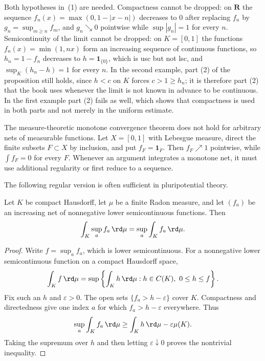 \begin{remark}
\label{rem:dini-hypotheses-sharp}
Both hypotheses in \,(1) are needed.  Compactness cannot
be dropped: on $\mathbf R$ the sequence $f_n(x)=\max(0,1-|x-n|)$ decreases to
$0$ after replacing $f_n$ by $g_n=\sup_{m\geq n}f_m$, and $g_n\searrow0$
pointwise while $\sup|g_n|=1$ for every $n$.  Semicontinuity of the limit
cannot be dropped: on $K=[0,1]$ the functions
$f_n(x)=\min(1,nx)$ form an increasing sequence of continuous functions, so
$h_n=1-f_n$ decreases to $h=\mathbf 1_{\{0\}}$, which is usc but not lsc, and
$\sup_K(h_n-h)=1$ for every $n$.  In the second example, part (2) of the
proposition still holds, since $h<c$ on $K$ forces $c>1\geq h_n$; it is
therefore part (2) that the book uses whenever the limit is not known in
advance to be continuous.  In the first example part (2) fails as well, which
shows that compactness is used in both parts and not merely in the uniform
estimate.
\end{remark}

\begin{remark}[Warning]
\label{rem:monotone-net-integration-warning}
The measure-theoretic monotone convergence theorem does not hold for
arbitrary nets of measurable functions.  Let $X=[0,1]$ with Lebesgue measure,
direct the finite subsets $F\subset X$ by inclusion, and put
$f_F=\mathbf 1_F$.  Then $f_F\nearrow1$ pointwise, while
$\int f_F=0$ for every $F$.  Whenever an argument integrates a monotone net,
it must use additional regularity or first reduce to a sequence.
\end{remark}

The following regular version is often sufficient in pluripotential theory.

\begin{proposition}\label{prop:lsc-net-monotone}
Let $K$ be compact Hausdorff, let $\mu$ be a finite Radon measure, and let
$(f_a)$ be an increasing net of nonnegative lower semicontinuous functions.
Then
\[
             \int_K\sup_a f_a\,\rd \mu
             =\sup_a\int_K f_a\,\rd \mu.
\]
\end{proposition}

\begin{proof}
Write $f=\sup_a f_a$, which is lower semicontinuous.  For a nonnegative lower
semicontinuous function on a compact Hausdorff space,
\[
 \int_K f\,\rd \mu
 =\sup\left\{\int_K h\,\rd \mu:h\in C(K),\ 0\leq h\leq f\right\}.
\]
Fix such an $h$ and $\varepsilon>0$.  The open sets
$\{f_a>h-\varepsilon\}$ cover $K$.  Compactness and directedness give one
index $a$ for which $f_a>h-\varepsilon$ everywhere.  Thus
\[
 \sup_a\int_K f_a\,\rd \mu
 \geq\int_Kh\,\rd \mu-\varepsilon\mu(K).
\]
Taking the supremum over $h$ and then letting $\varepsilon\downarrow0$ proves
the nontrivial inequality.
\end{proof}

